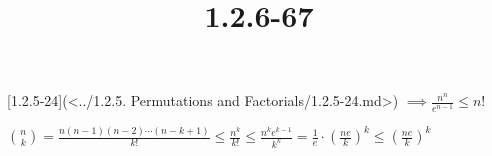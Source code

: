 \documentclass{article}
\title{1.2.6-67}
\begin{document}
\maketitle

[1.2.5-24](<../1.2.5. Permutations and Factorials/1.2.5-24.md>) \( \implies \frac{n^n}{e^{n-1}} \leq n! \)

\( \binom{n}{k} = \frac{n(n-1)(n-2)\cdots(n-k+1)}{k!} \leq \frac{n^k}{k!} \leq \frac{n^k e^{k-1}}{k^k} = \frac{1}{e} \cdot (\frac{ne}{k})^k \leq (\frac{ne}{k})^k \)
\end{document}
